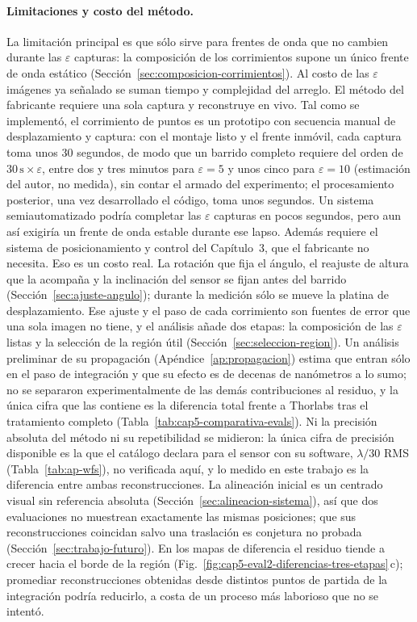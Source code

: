 \documentclass[letterpaper,12pt,oneside]{book}
\begin{document}
\paragraph{Limitaciones y costo del método.} La limitación principal es que sólo sirve
para frentes de onda que no cambien durante las $\varepsilon$ capturas: la composición de
los corrimientos supone un único frente de onda estático
(Sección~\ref{sec:composicion-corrimientos}). Al costo de las $\varepsilon$ imágenes ya
señalado se suman tiempo y complejidad del arreglo. El método del fabricante requiere una
sola captura y reconstruye en vivo. Tal como se implementó, el corrimiento de puntos es un
prototipo con secuencia manual de desplazamiento y captura: con el montaje listo y el
frente inmóvil, cada captura toma unos 30 segundos, de modo que un barrido completo
requiere del orden de $30\,\mathrm{s}\times\varepsilon$, entre dos y tres minutos para
$\varepsilon=5$ y unos cinco para $\varepsilon=10$ (estimación del autor, no medida), sin
contar el armado del experimento; el procesamiento posterior, una vez desarrollado el
código, toma unos segundos. Un sistema semiautomatizado podría completar las $\varepsilon$
capturas en pocos segundos, pero aun así exigiría un frente de onda estable durante ese
lapso. Además requiere el sistema de posicionamiento y control del Capítulo~3, que el
fabricante no necesita. Eso es un costo real. La rotación que fija el ángulo, el reajuste
de altura que la acompaña y la inclinación del sensor se fijan antes del barrido
(Sección~\ref{sec:ajuste-angulo}); durante la medición sólo se mueve la platina de
desplazamiento. Ese ajuste y el paso de cada corrimiento son fuentes de error que una sola
imagen no tiene, y el análisis añade dos etapas: la composición de las $\varepsilon$
listas y la selección de la región útil (Sección~\ref{sec:seleccion-region}). Un análisis
preliminar de su propagación (Apéndice~\ref{ap:propagacion}) estima que entran sólo en
el paso de integración y que su efecto es de decenas de nanómetros a lo sumo; no se separaron
experimentalmente de las demás contribuciones al residuo, y la única cifra que las
contiene es la diferencia total frente a Thorlabs tras el tratamiento completo
(Tabla~\ref{tab:cap5-comparativa-evals}). Ni la precisión absoluta del método ni su
repetibilidad se midieron: la única cifra de precisión disponible es la que el catálogo
declara para el sensor con su software, $\lambda/30$ RMS (Tabla~\ref{tab:ap-wfs}), no
verificada aquí, y lo medido en este trabajo es la diferencia entre ambas
reconstrucciones. La alineación inicial es un centrado visual sin referencia absoluta
(Sección~\ref{sec:alineacion-sistema}), así que dos evaluaciones no muestrean exactamente
las mismas posiciones; que sus reconstrucciones coincidan salvo una traslación es
conjetura no probada (Sección~\ref{sec:trabajo-futuro}). En los mapas de diferencia el
residuo tiende a crecer hacia el borde de la región
(Fig.~\ref{fig:cap5-eval2-diferencias-tres-etapas}\,c); promediar reconstrucciones
obtenidas desde distintos puntos de partida de la integración podría reducirlo, a costa de
un proceso más laborioso que no se intentó.
\end{document}
